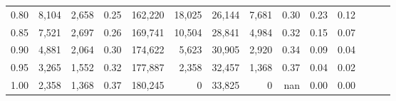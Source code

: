 \begin{tabular}{rrrrrrrrrrrrrr}
0.80 &   8,104 &  2,658 &  0.25 &  162,220 &   18,025 &  26,144 &   7,681 &  0.30 &  0.23 &      0.12 \\
0.85 &   7,521 &  2,697 &  0.26 &  169,741 &   10,504 &  28,841 &   4,984 &  0.32 &  0.15 &      0.07 \\
0.90 &   4,881 &  2,064 &  0.30 &  174,622 &    5,623 &  30,905 &   2,920 &  0.34 &  0.09 &      0.04 \\
0.95 &   3,265 &  1,552 &  0.32 &  177,887 &    2,358 &  32,457 &   1,368 &  0.37 &  0.04 &      0.02 \\
1.00 &   2,358 &  1,368 &  0.37 &  180,245 &        0 &  33,825 &       0 &   nan &  0.00 &      0.00 \\
\bottomrule
\end{tabular}
